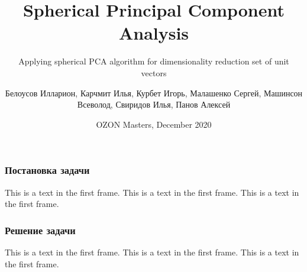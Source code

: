 \documentclass{beamer}
\title[Spherical Principal Component Analysis]{Spherical Principal Component Analysis}
\subtitle{Applying spherical PCA algorithm for dimensionality reduction set of unit vectors}
\author[] { Белоусов Илларион, Карчмит Илья, Курбет Игорь, Малашенко Сергей, Машинсон Всеволод, Свиридов Илья, Панов Алексей }
\date[]{OZON Masters, December 2020}
\begin{document}
\frame{\titlepage}

\begin{frame}
\frametitle{Постановка задачи}
This is a text in the first frame. This is a text in the first frame. This is a text in the first frame.
\end{frame}

\begin{frame}
\frametitle{Решение задачи}
This is a text in the first frame. This is a text in the first frame. This is a text in the first frame.
\end{frame}
\end{document}
